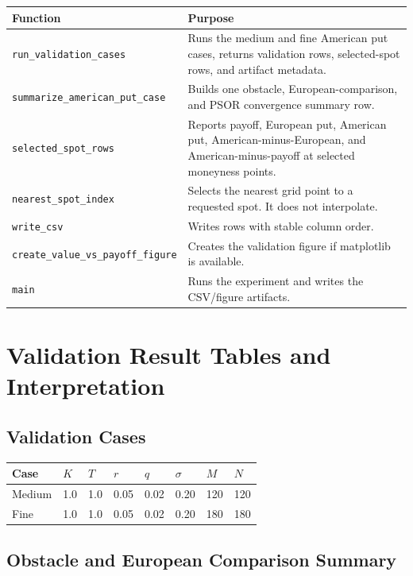 \documentclass[11pt,a4paper]{article}
\newcommand{\code}[1]{\texttt{#1}}
\begin{document}
\begin{longtable}{P{0.38\textwidth}L{0.54\textwidth}}
\toprule
Function & Purpose \\
\midrule
\endhead
\code{run\_validation\_cases} &
Runs the medium and fine American put cases, returns validation rows, selected-spot rows, and
artifact metadata. \\
\code{summarize\_american\_put\_case} &
Builds one obstacle, European-comparison, and PSOR convergence summary row. \\
\code{selected\_spot\_rows} &
Reports payoff, European put, American put, American-minus-European, and American-minus-payoff at
selected moneyness points. \\
\code{nearest\_spot\_index} &
Selects the nearest grid point to a requested spot. It does not interpolate. \\
\code{write\_csv} &
Writes rows with stable column order. \\
\code{create\_value\_vs\_payoff\_figure} &
Creates the validation figure if matplotlib is available. \\
\code{main} &
Runs the experiment and writes the CSV/figure artifacts. \\
\bottomrule
\end{longtable}

\section{Validation Result Tables and Interpretation}

\subsection{Validation Cases}

{\small
\begin{longtable}{@{}L{0.16\textwidth}L{0.07\textwidth}L{0.07\textwidth}L{0.07\textwidth}L{0.07\textwidth}L{0.09\textwidth}L{0.07\textwidth}L{0.07\textwidth}@{}}
\toprule
Case & \(K\) & \(T\) & \(r\) & \(q\) & \(\sigma\) & \(M\) & \(N\) \\
\midrule
\endhead
Medium & 1.0 & 1.0 & 0.05 & 0.02 & 0.20 & 120 & 120 \\
Fine & 1.0 & 1.0 & 0.05 & 0.02 & 0.20 & 180 & 180 \\
\bottomrule
\end{longtable}
}

\subsection{Obstacle and European Comparison Summary}
\end{document}
